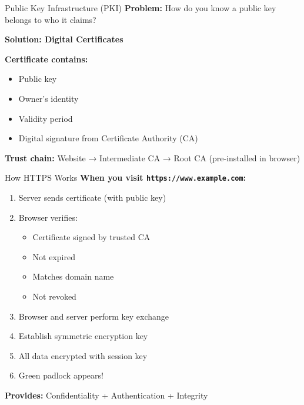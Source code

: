 \documentclass{beamer}
\begin{document}
\begin{frame}{Public Key Infrastructure (PKI)}
\textbf{Problem:} How do you know a public key belongs to who it claims?

\vspace{0.3cm}
\textbf{Solution: Digital Certificates}

\vspace{0.3cm}
\textbf{Certificate contains:}
\begin{itemize}
    \item Public key
    \item Owner's identity
    \item Validity period
    \item Digital signature from Certificate Authority (CA)
\end{itemize}

\vspace{0.3cm}
\textbf{Trust chain:}
Website → Intermediate CA → Root CA (pre-installed in browser)

\end{frame}

\begin{frame}{How HTTPS Works}
\textbf{When you visit \texttt{https://www.example.com}:}

\begin{enumerate}
    \item Server sends certificate (with public key)
    \item Browser verifies:
    \begin{itemize}
        \item Certificate signed by trusted CA
        \item Not expired
        \item Matches domain name
        \item Not revoked
    \end{itemize}
    \item Browser and server perform key exchange
    \item Establish symmetric encryption key
    \item All data encrypted with session key
    \item Green padlock appears!
\end{enumerate}

\vspace{0.3cm}
\textbf{Provides:} Confidentiality + Authentication + Integrity

\end{frame}
\end{document}
